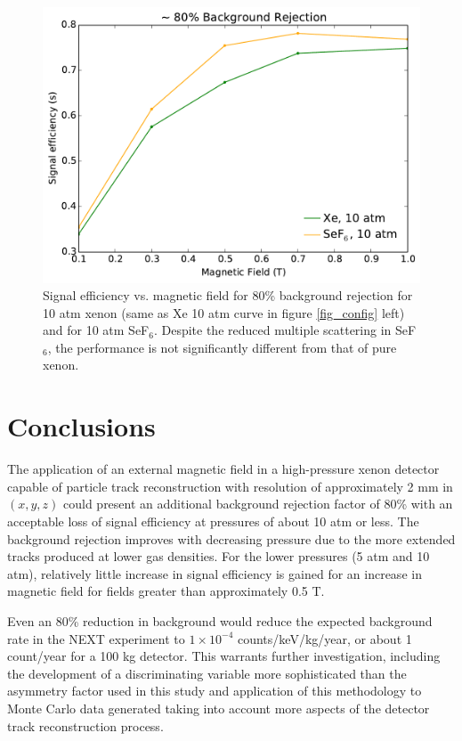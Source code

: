 \documentclass{JINST}
\begin{document}
\begin{figure}[!htb]
	\centering
	\includegraphics[scale=0.43]{fig/eff_vs_b_xe_sef6_80.pdf}
	\caption{\label{fig_xevssef6}Signal efficiency vs. magnetic field for 80\% background rejection for 10 atm xenon (same as Xe 10 atm curve in figure \protect\ref{fig_config} left) and for 10 atm SeF$_6$.  Despite the reduced multiple scattering in SeF$_6$, the performance is not significantly different from that of pure xenon.}
\end{figure}

\section{Conclusions}
The application of an external magnetic field in a high-pressure xenon detector capable of particle track reconstruction with resolution of approximately 2 mm in $(x,y,z)$ could present an additional background rejection factor of 80\% with an acceptable loss of signal efficiency at pressures of about 10 atm or less.  The background rejection improves with decreasing pressure due to the more extended tracks produced at lower gas densities.  For the lower pressures (5 atm and 10 atm), relatively little increase in signal efficiency is gained for an increase in magnetic field for fields greater than approximately 0.5 T.

Even an 80\% reduction in background would reduce the expected background rate in the NEXT experiment to
$1 \times 10^{-4}$ counts/keV/kg/year, or about 1 count/year for a 100 kg detector.  This warrants further
investigation, including the development of a discriminating variable more sophisticated than the asymmetry 
factor used in this study and application of this methodology to Monte Carlo data generated taking into account 
more aspects of the detector track reconstruction process.
\end{document}
